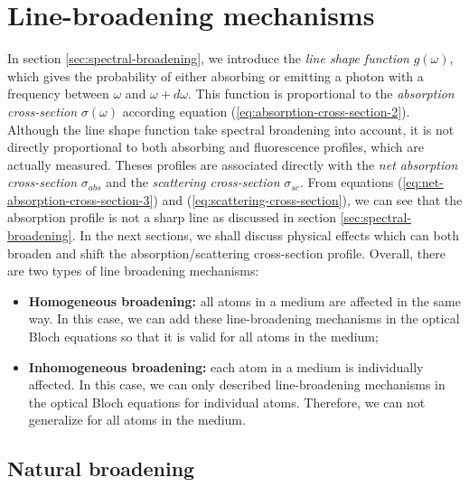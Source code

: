 %
\section{Line-broadening mechanisms}
\label{sec:line-broadening-mechanisms}
%

In section \ref{sec:spectral-broadening}, we introduce the \textit{line shape function} $ g(\omega) $, which gives the probability of either absorbing or emitting a photon with a frequency between $ \omega $ and $ \omega + d\omega $. This function is proportional to the \textit{absorption cross-section} $ \sigma(\omega) $ according equation (\ref{eq:absorption-cross-section-2}). Although the line shape function take spectral broadening into account, it is not directly proportional to both absorbing and fluorescence profiles, which are actually measured. Theses profiles are associated directly with the \textit{net absorption cross-section} $ \sigma_{abs} $ and the \textit{scattering cross-section} $ \sigma_{sc} $. From equations (\ref{eq:net-absorption-cross-section-3}) and (\ref{eq:scattering-cross-section}), we can see that the absorption profile is not a sharp line as discussed in section \ref{sec:spectral-broadening}. In the next sections, we shall discuss physical effects which can both broaden and shift the absorption/scattering cross-section profile. Overall, there are two types of line broadening mechanisms: 
\begin{itemize}
	\item \textbf{Homogeneous broadening:} all atoms in a medium are affected in the same way. In this case, we can add these line-broadening mechanisms in the optical Bloch equations so that it is valid for all atoms in the medium;

	\item \textbf{Inhomogeneous broadening:} each atom in a medium is individually affected. In this case, we can only described line-broadening mechanisms in the optical Bloch equations for individual atoms. Therefore, we can not generalize for all atoms in the medium.
\end{itemize}

\subsection{Natural broadening}
\label{sec:natural-broadening}

